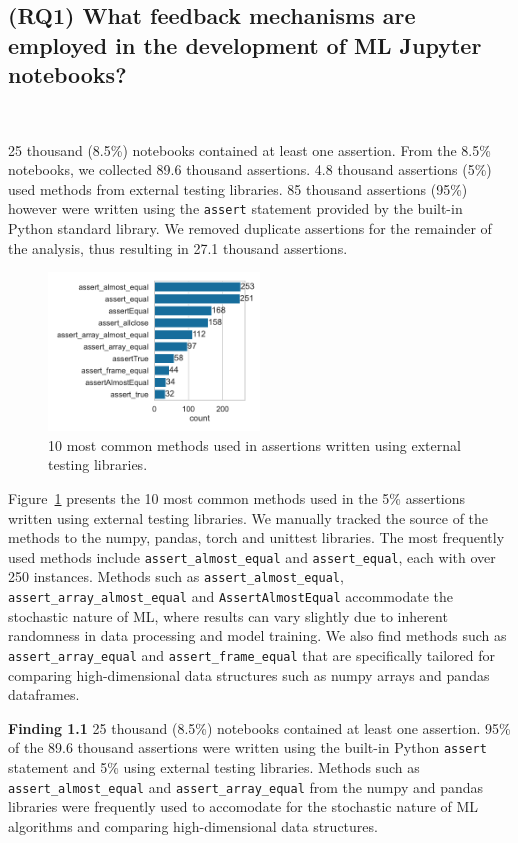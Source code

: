 \documentclass[smallextended]{svjour3}       %
\newcommand{\highlight}[1]{\begin{framed}%
  \noindent#1
\end{framed}}
\begin{document}
\subsection{(RQ1) What feedback mechanisms are employed in the development of ML Jupyter notebooks?}~\label{sec:result-analysis}

25 thousand (8.5\%) notebooks contained at least one assertion. From the 8.5\% notebooks, we collected 89.6 thousand assertions. 4.8 thousand assertions (5\%) used methods from external testing libraries. 85 thousand assertions (95\%) however were written using the \lstinline{assert} statement provided by the built-in Python standard library. We removed duplicate assertions for the remainder of the analysis, thus resulting in 27.1 thousand assertions.

\begin{figure}
  \centering
  \includegraphics[width=0.5\textwidth]{other-test-methods.pdf}
  \caption{10 most common methods used in assertions written using external testing libraries.}
  \label{fig:other-test-methods}
\end{figure}

Figure~\ref{fig:other-test-methods} presents the 10 most common methods used in the 5\% assertions written using external testing libraries. We manually tracked the source of the methods to the numpy, pandas, torch and unittest libraries. The most frequently used methods include \lstinline{assert_almost_equal} and \lstinline{assert_equal}, each with over 250 instances. Methods such as \lstinline{assert_almost_equal}, \lstinline{assert_array_almost_equal} and \lstinline{AssertAlmostEqual} accommodate the stochastic nature of ML, where results can vary slightly due to inherent randomness in data processing and model training. We also find methods such as \lstinline{assert_array_equal} and \lstinline{assert_frame_equal} that are specifically tailored for comparing high-dimensional data structures such as numpy arrays and pandas dataframes.

\highlight{\textbf{Finding 1.1} 25 thousand (8.5\%) notebooks contained at least one assertion. 95\% of the 89.6 thousand assertions were written using the built-in Python \lstinline{assert} statement and 5\% using external testing libraries. Methods such as \lstinline{assert_almost_equal} and \lstinline{assert_array_equal} from the numpy and pandas libraries were frequently used to accomodate for the stochastic nature of ML algorithms and comparing high-dimensional data structures.}
\end{document}
